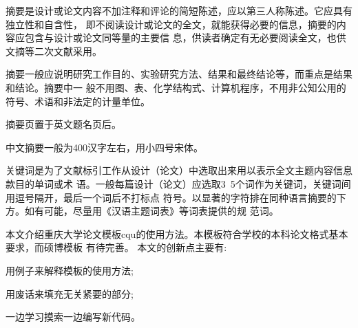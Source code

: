 \documentclass[bachelor,zhspacing]{cqu}  %
\begin{document}
\cnkind{****}
\enkind{****}
\makecntitle 
\makeentitle 

\setcounter{page}{0}
\begin{cnabstract}
摘要是设计或论文内容不加注释和评论的简短陈述，应以第三人称陈述。它应具有独立性和自含性，
即不阅读设计或论文的全文，就能获得必要的信息，摘要的内容应包含与设计或论文同等量的主要信
息，供读者确定有无必要阅读全文，也供文摘等二次文献采用。\par
摘要一般应说明研究工作目的、实验研究方法、结果和最终结论等，而重点是结果和结论。摘要中一
般不用图、表、化学结构式、计算机程序，不用非公知公用的符号、术语和非法定的计量单位。\par
摘要页置于英文题名页后。 \par
中文摘要一般为400汉字左右，用小四号宋体。 \par
关键词是为了文献标引工作从设计（论文）中选取出来用以表示全文主题内容信息款目的单词或术
语。一般每篇设计（论文）应选取3~5个词作为关键词，关键词间用逗号隔开，最后一个词后不打标点
符号。以显著的字符排在同种语言摘要的下方。如有可能，尽量用《汉语主题词表》等词表提供的规
范词。\par
本文介绍重庆大学论文模板cqu的使用方法。本模板符合学校的本科论文格式基本要求，而硕博模板
有待完善。
本文的创新点主要有:
\begin{itemize*}
\item 用例子来解释模板的使用方法;
\item 用废话来填充无关紧要的部分;
\item 一边学习摸索一边编写新代码。
\end{itemize*}
\end{cnabstract} 
\end{document}
